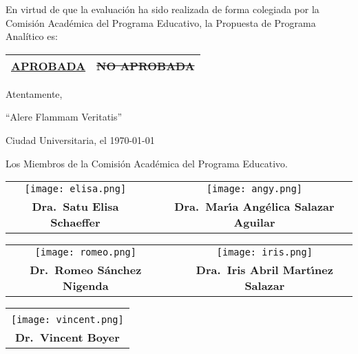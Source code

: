 \documentclass{article}
\renewcommand{\arraystretch}{2.0}
\newcommand{\felisa}{{\vspace*{-6mm}\texttt{[image: elisa.png]}}}
\newcommand{\fangy}{{\vspace*{-13mm}\texttt{[image: angy.png]}}}
\newcommand{\fromeo}{{\vspace*{-4mm}\texttt{[image: romeo.png]}}}
\newcommand{\firis}{{\vspace*{-7mm}\texttt{[image: iris.png]}}}
\newcommand{\fvincent}{{\vspace*{-7mm}\texttt{[image: vincent.png]}}}
\newcommand{\angy}{Dra.\ Mar\'{\i}a Ang\'{e}lica Salazar Aguilar}
\newcommand{\vincent}{Dr.\ Vincent Boyer}
\newcommand{\iris}{Dra.\ Iris Abril Mart\'{\i}nez Salazar}
\newcommand{\elisa}{Dra.\ Satu Elisa Schaeffer}
\newcommand{\romeo}{Dr.\ Romeo S\'{a}nchez Nigenda}
\begin{document}
\newpage

En virtud de que la evaluaci\'{o}n ha sido realizada de forma colegiada por la Comisi\'{o}n Acad\'{e}mica del
Programa Educativo, la Propuesta de Programa Anal\'{i}tico es:

\begin{center}

  \begin{tabular}{|c|c|}
    \hline 
    \underline{\bf APROBADA} & \st{NO APROBADA} \\
    \hline
  \end{tabular}
  
  \quad
  
  Atentamente,
  
  ``Alere Flammam Veritatis''
  
  Ciudad Universitaria, el \today
  
  \quad
  
  Los Miembros de la Comisi\'{o}n Acad\'{e}mica del Programa Educativo.
  
\end{center}

\begin{minipage}[c]{\textwidth}
  \begin{center}
    \begin{tabular}{ccc}
      \felisa & \phantom{mm}
      & \fangy \\
          {\bf \elisa} & 
          & {\bf \angy }
    \end{tabular}
  \end{center}
\end{minipage}

\begin{minipage}[c]{\textwidth}
\begin{center}
\begin{tabular}{ccc}
  \fromeo & \phantom{mm}
  & \firis \\
      {\bf \romeo} & \phantom{mm}
      & {\bf \iris } \\
\end{tabular}
\end{center}
\end{minipage}

\renewcommand{\arraystretch}{1.7}  
\begin{minipage}[c]{\textwidth}
\begin{center}
  \begin{tabular}{c}
    \phantom{xx} \\
  \fvincent \\
    {\bf \vincent} 
\end{tabular}
\end{center}
\end{minipage}
\end{document}
